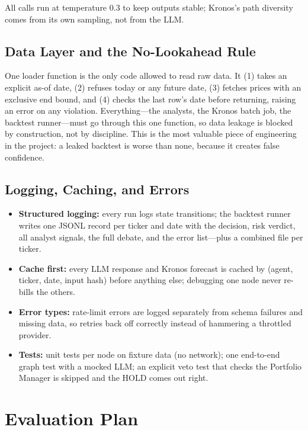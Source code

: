 \documentclass[conference]{IEEEtran}
\begin{document}
All calls run at temperature 0.3 to keep outputs stable; Kronos's path diversity comes from its own sampling, not from the LLM.

\subsection{Data Layer and the No-Lookahead Rule}
\label{sec:arch-data}

One loader function is the only code allowed to read raw data. It (1) takes an explicit as-of date, (2) refuses today or any future date, (3) fetches prices with an exclusive end bound, and (4) checks the last row's date before returning, raising an error on any violation. Everything---the analysts, the Kronos batch job, the backtest runner---must go through this one function, so data leakage is blocked by construction, not by discipline. This is the most valuable piece of engineering in the project: a leaked backtest is worse than none, because it creates false confidence.

\subsection{Logging, Caching, and Errors}

\begin{itemize}[leftmargin=*,itemsep=1pt,topsep=2pt]
  \item \textbf{Structured logging:} every run logs state transitions; the backtest runner writes one JSONL record per ticker and date with the decision, risk verdict, all analyst signals, the full debate, and the error list---plus a combined file per ticker.
  \item \textbf{Cache first:} every LLM response and Kronos forecast is cached by (agent, ticker, date, input hash) before anything else; debugging one node never re-bills the others.
  \item \textbf{Error types:} rate-limit errors are logged separately from schema failures and missing data, so retries back off correctly instead of hammering a throttled provider.
  \item \textbf{Tests:} unit tests per node on fixture data (no network); one end-to-end graph test with a mocked LLM; an explicit veto test that checks the Portfolio Manager is skipped and the HOLD comes out right.
\end{itemize}

\section{Evaluation Plan}
\label{sec:eval}
\end{document}
